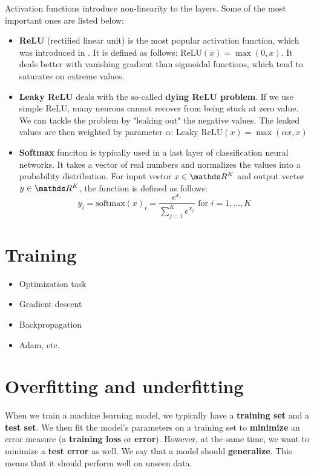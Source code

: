 Activation functions introduce non-linearity to the layers. Some of the most important ones are listed below:
\begin{itemize}
\item \textbf{ReLU} (rectified linear unit) is the most popular activation function, which was introduced in \cite{pmlr-v15-glorot11a}. It is defined as follows: $\text{ReLU}(x) = \max(0, x)$. It deals better with vanishing gradient than sigmoidal functions, which tend to saturates on extreme values.
\item \textbf{Leaky ReLU} deals with the so-called \textbf{dying ReLU problem}. If we use simple ReLU, many neurons cannot recover from being stuck at zero value. We can tackle the problem by "leaking out" the negative values. The leaked values are then weighted by parameter $\alpha$: $\text{Leaky ReLU}(x) = \max(\alpha x, x)$
\item \textbf{Softmax} funciton is typically used in a last layer of classification neural networks. It takes a vector of real numbers and normalizes the values into a probability distribution. For input vector $x \in \real^K$ and output vector $y \in \real^K$, the function is defined as follows:
$$
    y_i = \text{softmax}(x)_i = \frac{e^{x_i}}{\sum\limits^{K}_{j = 1} e^{x_j}} \text{ for } i = 1,...,K
$$
\end{itemize}

\section{Training}
\begin{itemize}
    \item Optimization task
    \item Gradient descent
    \item Backpropagation
    \item Adam, etc.
\end{itemize}

\section{Overfitting and underfitting}

When we train a machine learning model, we typically have a \textbf{training set} and a \textbf{test set}. We then fit the model's parameters on a training set to \textbf{minimize} an error measure (a \textbf{training loss} or \textbf{error}). However, at the same time, we want to minimize a \textbf{test error} as well. We say that a model should \textbf{generalize}. This means that it should perform well on unseen data.

